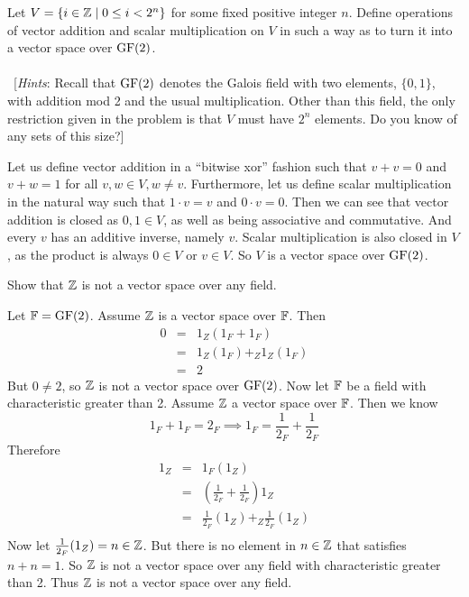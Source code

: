 \begin{problem}[Golan 63]

Let $V = \{ i \in \mathbb{Z} \mid 0 \leq i < 2^n \}$ for some fixed positive integer
$n$.  Define operations of vector addition and scalar multiplication on $V$ in
such a way as to turn it into a vector space over $\operatorname{GF}(2)$.\\
\\
~[{\it Hints}: Recall that $\operatorname{GF}(2)$ denotes the Galois field with two elements,
  $\{0, 1\}$, with addition mod 2 and the usual multiplication.
  Other than this field, the only restriction given in the
  problem is that $V$ must have $2^n$ elements. Do you know of any sets of this size?]
\end{problem}
\smallskip
\begin{solution}
Let us define vector addition in a ``bitwise xor'' fashion such that $v + v = 0$ and $v + w = 1$ for all $v,w \in V, w \neq v$. Furthermore, let us define scalar multiplication in the natural way such that $1\cdot v = v$ and $0\cdot v = 0$.  Then we can see that vector addition is closed as $0,1 \in V$, as well as being associative and commutative. And every $v$ has an additive inverse, namely $v$. Scalar multiplication is also closed in $V$, as the product is always $0 \in V$ or $v \in V$. So $V$ is a vector space over $\operatorname{GF}(2)$. 
\end{solution}
\probskip

\begin{ProbBox}  
\newcommand{\F}{\fld{F}}
\begin{problem}[Golan 70]
Show that $\mathbb{Z}$ is not a vector space over any field.
\end{problem}
\smallskip
\begin{solution}
Let $\mathbb{F} = \operatorname{GF}(2)$. Assume $\mathbb{Z}$ is a vector space over $\F$. Then
\begin{eqnarray*}
0 & = & 1_Z(1_F + 1_F) \\
  & = & 1_Z(1_{F})+_Z 1_Z(1_F) \\
  & = & 2 
\end{eqnarray*}
But $0 \neq 2$, so $\mathbb{Z}$ is not a vector space over $\operatorname{GF}(2)$. Now let $\F$ be a field with characteristic greater than 2. Assume $\mathbb{Z}$ a vector space over $\F$. Then we know
$$ 1_F + 1_F = 2_F \implies 1_F = \frac{1}{2_F} + \frac{1}{2_F}$$
Therefore
\begin{eqnarray*}
1_Z & = & 1_F(1_Z) \\
	& = & (\frac{1}{2_F} + \frac{1}{2_F})1_Z \\
	& = & \frac{1}{2_F}(1_Z) +_Z \frac{1}{2_F}(1_Z) \\
\end{eqnarray*}
Now let $\frac{1}{2_F}(1_Z) = n \in \mathbb{Z}$.  But there is no element in $n \in \mathbb{Z}$ that satisfies $n + n = 1$. So $\mathbb{Z}$ is not a vector space over any field with characteristic greater than 2. Thus $\mathbb{Z}$ is not a vector space over any field. 
\end{solution}
\probskip
\end{ProbBox}


